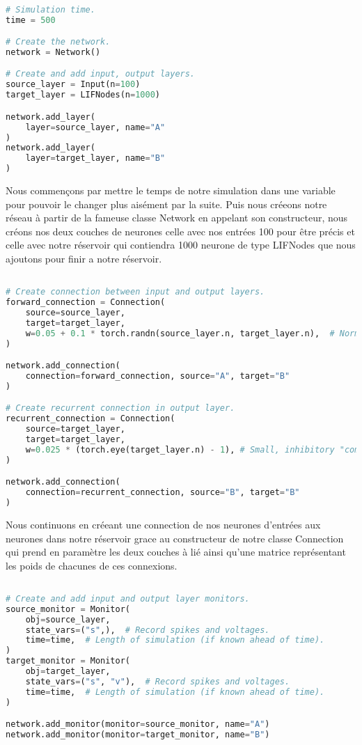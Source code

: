 \begin{lstlisting}[language=Python]

# Simulation time.
time = 500

# Create the network.
network = Network()

# Create and add input, output layers.
source_layer = Input(n=100)
target_layer = LIFNodes(n=1000)

network.add_layer(
    layer=source_layer, name="A"
)
network.add_layer(
    layer=target_layer, name="B"
)

\end{lstlisting}

Nous commençons par mettre le temps de notre simulation dans une variable pour pouvoir le changer plus aisément par la suite. Puis nous créeons notre réseau à partir de la fameuse classe Network en appelant
son constructeur, nous créons nos deux couches de neurones celle avec nos entrées 100 pour être précis et celle avec notre réservoir qui contiendra 1000 neurone de type LIFNodes que nous ajoutons pour finir a notre réservoir.

\begin{lstlisting}[language=Python]

# Create connection between input and output layers.
forward_connection = Connection(
    source=source_layer,
    target=target_layer,
    w=0.05 + 0.1 * torch.randn(source_layer.n, target_layer.n),  # Normal(0.05, 0.01) weights.
)

network.add_connection(
    connection=forward_connection, source="A", target="B"
)

# Create recurrent connection in output layer.
recurrent_connection = Connection(
    source=target_layer,
    target=target_layer,
    w=0.025 * (torch.eye(target_layer.n) - 1), # Small, inhibitory "competitive" weights.
)

network.add_connection(
    connection=recurrent_connection, source="B", target="B"
)

\end{lstlisting}

Nous continuons en créeant une connection de nos neurones d'entrées aux neurones dans notre réservoir grace au constructeur de notre classe Connection qui prend en paramètre les deux couches à lié ainsi qu'une matrice représentant les poids de chacunes de ces connexions.

\begin{lstlisting}[language=Python]

# Create and add input and output layer monitors.
source_monitor = Monitor(
    obj=source_layer,
    state_vars=("s",),  # Record spikes and voltages.
    time=time,  # Length of simulation (if known ahead of time).
)
target_monitor = Monitor(
    obj=target_layer,
    state_vars=("s", "v"),  # Record spikes and voltages.
    time=time,  # Length of simulation (if known ahead of time).
)

network.add_monitor(monitor=source_monitor, name="A")
network.add_monitor(monitor=target_monitor, name="B")


\end{lstlisting}

